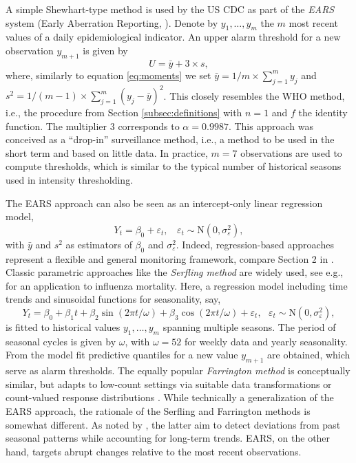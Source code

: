 \documentclass[12pt]{article}
\begin{document}
A simple Shewhart-type method is used by the US CDC as part of the \textit{EARS} system (Early Aberration Reporting, \citealt{Hutwagner2003}). Denote by $y_1, \dots, y_m$ the $m$ most recent values of a daily epidemiological indicator. An upper alarm threshold for a new observation $y_{m + 1}$ is given by
$$
U = \bar{y} + 3 \times s,
$$ 
where, similarly to equation \eqref{eq:moments} we set $\bar{y} = 1/m \times \sum_{j = 1}^m y_j$ and $s^2 = 1/(m - 1) \times \sum_{j = 1}^m (y_j - \bar{y})^2$. This closely resembles the WHO method, i.e., the procedure from Section \ref{subsec:definitions} with $n = 1$ and $f$ the identity function. The multiplier 3 corresponds to $\alpha = 0.9987$. This approach was conceived as a ``drop-in'' surveillance method, i.e., a method to be used in the short term and based on little data. In practice, $m = 7$ observations are used to compute thresholds, which is similar to the typical number of historical seasons used in intensity thresholding.

The EARS approach can also be seen as an intercept-only linear regression model,
$$
Y_{t} = \beta_0 + \varepsilon_{t}, \ \ \ \ \varepsilon_t \sim \text{N}(0, \sigma_\varepsilon^2),
$$
with $\bar{y}$ and $s^2$ as estimators of $\beta_0$ and $\sigma_\varepsilon^2$. Indeed, regression-based approaches represent a flexible and general monitoring framework, compare Section 2 in \cite{Unkel2012}. Classic parametric approaches like the \textit{Serfling method} \citep{Serfling1896} are widely used, see e.g., \cite{Thompson2009} for an application to influenza mortality. Here, a regression model including time trends and sinusoidal functions for seasonality, say,
\begin{equation}
Y_{t} = \beta_0 + \beta_1 t + \beta_2 \sin(2\pi t / \omega) + \beta_3 \cos(2\pi t / \omega) + \varepsilon_t, \ \ \ \varepsilon_t \sim \text{N}(0, \sigma_\varepsilon^2),
\label{eq:serfling}
\end{equation}
is fitted to historical values $y_1, \dots, y_m$ spanning multiple seasons. The period of seasonal cycles is given by $\omega$, with $\omega = 52$ for weekly data and yearly seasonality. From the model fit predictive quantiles for a new value $y_{m + 1}$ are obtained, which serve as alarm thresholds. The equally popular \textit{Farrington method} is conceptually similar, but adapts to low-count settings via suitable data transformations \citep{Farrington1996} or count-valued response distributions \citep{Noufaily2013}. While technically a generalization of the EARS approach, the rationale of the Serfling and Farrington methods is somewhat different. As noted by \cite{Hutwagner2003}, the latter aim to detect deviations from past seasonal patterns while accounting for long-term trends. EARS, on the other hand, targets abrupt changes relative to the most recent observations.
\end{document}
